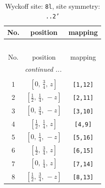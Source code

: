 \documentclass[fleqn,8pt]{jsarticle}
\begin{document}
\begin{longtable}{ccc}
\caption{Wyckoff site: {\tt 8l}, site symmetry: {\tt ..2'}}
 \\
 \hline \hline
No. & position & mapping \\ \hline \endfirsthead

\multicolumn{2}{l}{\tablename\ \thetable{}} \\
 \hline \hline
No. & position & mapping \\ \hline \endhead

 \hline \hline
\multicolumn{2}{r}{\footnotesize\it continued ...} \\ \endfoot

 \hline \hline
\multicolumn{2}{r}{} \\ \endlastfoot

1 & $\left[ 0,\, \frac{3}{4},\, z \right]$ & {\tt [1,12]} \\ \hline
2 & $\left[ \frac{1}{2},\, \frac{1}{4},\, - z \right]$ & {\tt [2,11]} \\ \hline
3 & $\left[ 0,\, \frac{3}{4},\, - z \right]$ & {\tt [3,10]} \\ \hline
4 & $\left[ \frac{1}{2},\, \frac{1}{4},\, z \right]$ & {\tt [4,9]} \\ \hline
5 & $\left[ 0,\, \frac{1}{4},\, - z \right]$ & {\tt [5,16]} \\ \hline
6 & $\left[ \frac{1}{2},\, \frac{3}{4},\, z \right]$ & {\tt [6,15]} \\ \hline
7 & $\left[ 0,\, \frac{1}{4},\, z \right]$ & {\tt [7,14]} \\ \hline
8 & $\left[ \frac{1}{2},\, \frac{3}{4},\, - z \right]$ & {\tt [8,13]} \\
\end{longtable}
\renewcommand{\arraystretch}{1.2}
\end{document}
